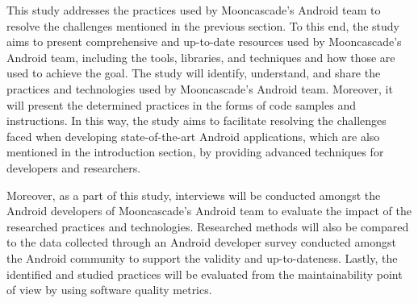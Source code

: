 This study addresses the practices used by Mooncascade’s Android team to resolve the challenges mentioned in the previous section. To this end, the study aims to present comprehensive and up-to-date resources used by Mooncascade's Android team, including the tools, libraries, and techniques and how those are used to achieve the goal. The study will identify, understand, and share the practices and technologies used by Mooncascade's Android team. Moreover, it will present the determined practices in the forms of code samples and instructions. In this way, the study aims to facilitate resolving the challenges faced when developing state-of-the-art Android applications, which are also mentioned in the introduction section, by providing advanced techniques for developers and researchers.  

Moreover,  as a part of this study, interviews will be conducted amongst the Android developers of Mooncascade's Android team to evaluate the impact of the researched practices and technologies. Researched methods will also be compared to the data collected through an Android developer survey conducted amongst the Android community to support the validity and up-to-dateness. Lastly, the identified and studied practices will be evaluated from the maintainability point of view by using software quality metrics.